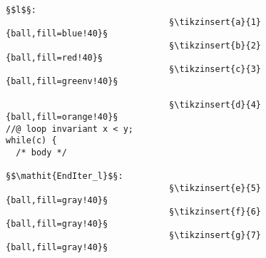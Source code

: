 \begin{figure}[bt]
  \begin{minipage}{0.65\textwidth}
  \end{minipage}\hfill
  \begin{minipage}{0.49\textwidth}
    \begin{lstlisting}[escapechar=§]
§$l$§:
                                §\tikzinsert{a}{1}{ball,fill=blue!40}§
                                §\tikzinsert{b}{2}{ball,fill=red!40}§
                                §\tikzinsert{c}{3}{ball,fill=greenv!40}§

                                §\tikzinsert{d}{4}{ball,fill=orange!40}§
//@ loop invariant x < y;
while(c) {
  /* body */

§$\mathit{EndIter_l}$§:
                                §\tikzinsert{e}{5}{ball,fill=gray!40}§
                                §\tikzinsert{f}{6}{ball,fill=gray!40}§
                                §\tikzinsert{g}{7}{ball,fill=gray!40}§


\end{lstlisting}
\end{minipage}
\end{figure}
